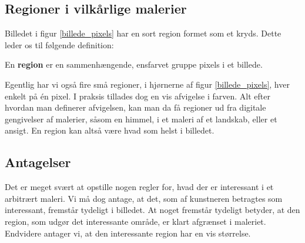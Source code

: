 {\subsection{Regioner i vilkårlige malerier}
Billedet i figur \ref{billede_pixels} har en sort region formet som et
kryds. Dette leder os til følgende definition:
\begin{definition}
    En \textbf{region} er en sammenhængende, ensfarvet gruppe pixels i
    et billede.
    \label{def_region}
\end{definition}
Egentlig har vi også fire små regioner, i hjørnerne af figur
\ref{billede_pixels}, hver enkelt på én pixel. I praksis tillades dog en
vis afvigelse i farven. Alt efter hvordan man definerer afvigelsen, kan
man da få regioner ud fra digitale gengivelser af malerier, såsom en
himmel, i et maleri af et landskab, eller et ansigt.  En region kan
altså være hvad som helst i billedet.

\subsection{Antagelser}
Det er meget svært at opstille nogen regler for, hvad der er interessant
i et arbitrært maleri. Vi må dog antage, at det, som af kunstneren
betragtes som interessant, fremstår tydeligt i billedet. At noget
fremstår tydeligt betyder, at den region, som udgør det interessante
område, er klart afgrænset i maleriet. Endvidere antager vi, at den
interessante region har en vis størrelse.

}

